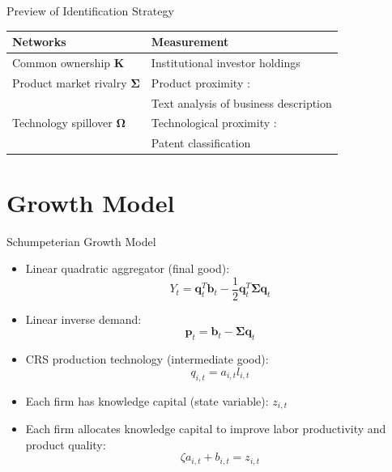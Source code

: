 \documentclass[
  10pt,
  aspectratio=169,   %
]{beamer}
\theoremstyle{plain}
\begin{document}
\begin{frame}{Preview of Identification Strategy}
  \label{identification_overview} %
  \begin{center}
    \renewcommand{\arraystretch}{1.5} %
    \begin{tabular}{lV{\linewidth}}
      Networks                              & Measurement\tabularnewline
      \hline\hline
      Common ownership $\bm{K}$         & Institutional investor holdings \citep{Backus2021-yt} \tabularnewline
      \hline
      Product market rivalry $\bm{\Sigma}$ & Product proximity \citep{Hoberg2016-jm}: \tabularnewline
                                          & Text analysis of business description \tabularnewline
      \hline
      Technology spillover $\bm{\Omega}$   & Technological proximity \citep{Jaffe1986-yz,Bloom2013-pn}: \tabularnewline
                                          & Patent classification\tabularnewline
    \end{tabular}
    \renewcommand{\arraystretch}{1.0} %
  \end{center}
\end{frame}

\section{Growth Model}
\begin{frame}{Schumpeterian Growth Model}
  \begin{itemize}
    \item Linear quadratic aggregator (final good):
    \[
      Y_{t}=\bm{q}_{t}^{T}\bm{b}_{t}-\frac{1}{2}\bm{q}_{t}^{T}\bm{\Sigma}\bm{q}_{t}
    \]
    \item Linear inverse demand:
    \[
      \bm{p}_{t}=\bm{b}_{t}-\bm{\Sigma}\bm{q}_{t}
    \]
    \item CRS production technology (intermediate good): \[q_{i,t}=a_{i,t}l_{i,t}\]
    \item Each firm has knowledge capital (state variable): $z_{i,t}$
    \medskip{}
    \item Each firm allocates knowledge capital to improve labor productivity and product quality:
    \[
      \zeta a_{i,t}+b_{i,t}=z_{i,t}
    \]
  \end{itemize}
\end{frame}
\end{document}
